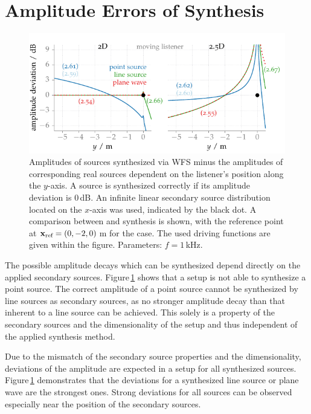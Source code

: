 \section{Amplitude Errors of \twohalfD Synthesis}
\label{sec:amplitude_errors_of_25d_synthesis}
%
\begin{figure}
    \centering
    \includegraphics{fig3_01/fig3_01}
    \caption{Amplitudes of sources synthesized via
    \ac{WFS} minus the amplitudes of corresponding real sources
    dependent on the listener's position along
    the $y$-axis. A source is synthesized correctly if its amplitude
    deviation is $0$\,dB. An infinite linear secondary source distribution
    located on the $x$-axis was used, indicated by the black dot.
    A comparison between \twoD and \twohalfD
    synthesis is shown, with the reference point at $\mathbf{x}_\text{ref} = (0,-2,0)$\,m
    for the \twohalfD case. The used driving functions are given within the
    figure.
    Parameters: $f=1$\,kHz.
    }
    \label{fig:amplitudes}
    \vspace{-0.5cm}
\end{figure}
%
\noindent The possible amplitude decays which can be synthesized depend directly on the
applied secondary sources. Figure\,\ref{fig:amplitudes} shows that a \twoD setup
is not able to synthesize a point source.
The correct amplitude of a point source cannot be synthesized by line
sources as secondary sources, as no stronger amplitude decay than that inherent
to a line source can be achieved.
This solely is a property of the
secondary sources and the dimensionality of the setup and thus independent of
the applied synthesis method.

Due to the mismatch of the secondary source properties and the dimensionality,
deviations of the amplitude are expected in a \twohalfD setup for all synthesized
sources. Figure\,\ref{fig:amplitudes} demonstrates that the deviations for a
synthesized line source or plane wave are the strong\-est ones.
Strong deviations for all sources can be observed especially near the
position of the secondary sources.

